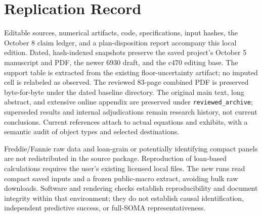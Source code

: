 \section{Replication Record}\label{app:replication}

Editable sources, numerical artifacts, code, specifications, input hashes, the October 8 claim ledger, and a plan-disposition report accompany this local edition. Dated, hash-indexed snapshots preserve the saved project's October 5 manuscript and PDF, the newer 6930 draft, and the c470 editing base. The support table is extracted from the existing floor-uncertainty artifact; no imputed cell is relabeled as observed. The reviewed 83-page combined PDF is preserved byte-for-byte under the dated baseline directory. The original main text, long abstract, and extensive online appendix are preserved under \texttt{reviewed\_archive}; superseded results and internal adjudications remain research history, not current conclusions. Current references attach to actual equations and exhibits, with a semantic audit of object types and selected destinations.

Freddie/Fannie raw data and loan-grain or potentially identifying compact panels are not redistributed in the source package. Reproduction of loan-based calculations requires the user's existing licensed local files. The new runs read compact saved inputs and a frozen public-macro extract, avoiding bulk raw downloads. Software and rendering checks establish reproducibility and document integrity within that environment; they do not establish causal identification, independent predictive success, or full-SOMA representativeness.





